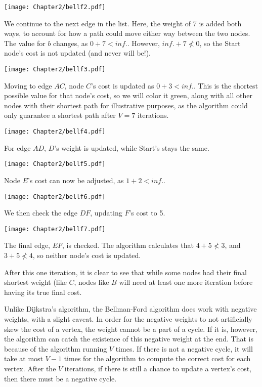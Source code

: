 \begin{center}
\texttt{[image: Chapter2/bellf2.pdf]}
\end{center}
We continue to the next edge in the list. Here, the weight of 7 is added both ways, to account for how a path could move either way between the two nodes. The value for $b$ changes, as $0 + 7 < inf.$. However, $inf. + 7 \nless0$, so the Start node's cost is not updated (and never will be!).

\begin{center}
\texttt{[image: Chapter2/bellf3.pdf]}
\end{center}
Moving to edge $AC$, node $C$'s cost is updated as $0 + 3 < inf.$. This is the shortest possible value for that node's cost, so we will color it green, along with all other nodes with their shortest path for illustrative purposes, as the algorithm could only guarantee a shortest path after $V =7 $ iterations.

\begin{center}
\texttt{[image: Chapter2/bellf4.pdf]}
\end{center}
For edge $AD$, $D$'s weight is updated, while Start's stays the same.


\begin{center}
\texttt{[image: Chapter2/bellf5.pdf]}
\end{center}
Node $E$'s cost can now be adjusted, as $1 + 2 < inf.$. 


\begin{center}
\texttt{[image: Chapter2/bellf6.pdf]}
\end{center}
We then check the edge $DF$, updating $F$'s cost to 5.

\begin{center}
\texttt{[image: Chapter2/bellf7.pdf]}
\end{center}
The final edge, $EF$, is checked. The algorithm calculates that $4 + 5 \nless 3$, and $3 + 5 \nless 4$, so neither node's cost is updated.



After this one iteration, it is clear to see that while some nodes had their final shortest weight (like $C$, nodes like $B$ will need at least one more iteration before having its true final cost.


Unlike Dijkstra's algorithm, the Bellman-Ford algorithm does work with negative weights, with a slight caveat. In order for the negative weights to not artificially skew the cost of a vertex, the weight cannot be a part of a cycle. If it is, however, the algorithm can catch the existence of this negative weight at the end. That is because of the algorithm running $V$ times. If there is not a negative cycle, it will take at most $V-1$ times for the algorithm to compute the correct cost for each vertex. After the $V$ iterations, if there is still a chance to update a vertex's cost, then there must be a negative cycle.
